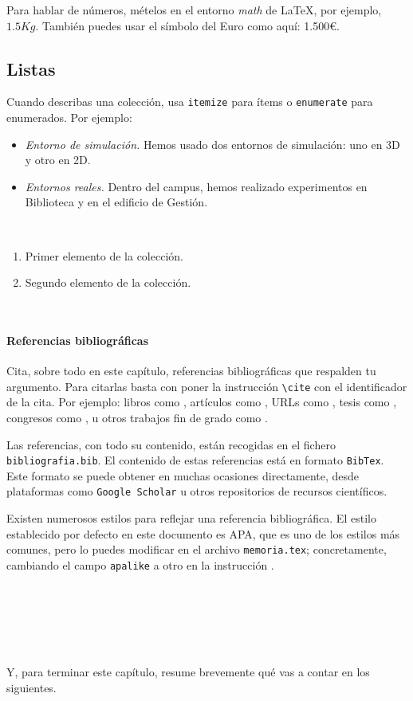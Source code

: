 Para hablar de números, mételos en el entorno \textit{math} de \LaTeX, por ejemplo, $1.5Kg$. También puedes usar el símbolo del Euro como aquí: 1.500\euro.

\subsection{Listas}

Cuando describas una colección, usa \texttt{itemize} para ítems o \texttt{enumerate} para enumerados. Por ejemplo:

\begin{itemize}
 \item \textit{Entorno de simulación.} Hemos usado dos entornos de simulación: uno en 3D y otro en 2D.
 \item \textit{Entornos reales.} Dentro del campus, hemos realizado experimentos en Biblioteca y en el edificio de Gestión.
\end{itemize}\

\begin{enumerate}
 \item Primer elemento de la colección.
 \item Segundo elemento de la colección.
\end{enumerate}\

\paragraph{Referencias bibliográficas}
\label{sec:referencias}

Cita, sobre todo en este capítulo, referencias bibliográficas que respalden tu argumento. Para citarlas basta con poner la instrucción \verb|\cite| con el identificador de la cita. Por ejemplo: libros como \cite{vega12e}, artículos como \cite{vega19b}, URLs como \cite{vega19a}, tesis como \cite{vega18b}, congresos como \cite{vega18a}, u otros trabajos fin de grado como \cite{vega08b}.

Las referencias, con todo su contenido, están recogidas en el fichero \texttt{bibliografia.bib}. El contenido de estas referencias está en formato \texttt{BibTex}. Este formato se puede obtener en muchas ocasiones directamente, desde plataformas como \texttt{Google Scholar} u otros repositorios de recursos científicos.

Existen numerosos estilos para reflejar una referencia bibliográfica. El estilo establecido por defecto en este documento es APA, que es uno de los estilos más comunes, pero lo puedes modificar en el archivo \texttt{memoria.tex}; concretamente, cambiando el campo \verb|apalike| a otro en la instrucción \verb||. 

\

\

\

Y, para terminar este capítulo, resume brevemente qué vas a contar en los siguientes.
